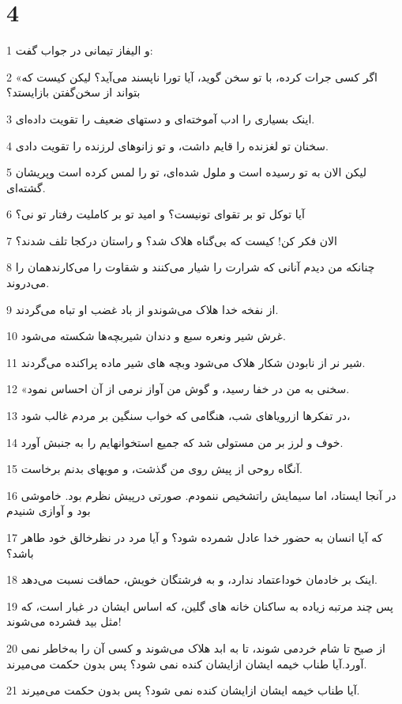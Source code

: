 \chapter{4}

\par 1 و الیفاز تیمانی در جواب گفت:
\par 2 «اگر کسی جرات کرده، با تو سخن گوید، آیا تورا ناپسند می‌آید؟ لیکن کیست که بتواند از سخن‌گفتن بازایستد؟
\par 3 اینک بسیاری را ادب آموخته‌ای و دستهای ضعیف را تقویت داده‌ای.
\par 4 سخنان تو لغزنده را قایم داشت، و تو زانوهای لرزنده را تقویت دادی.
\par 5 لیکن الان به تو رسیده است و ملول شده‌ای، تو را لمس کرده است وپریشان گشته‌ای.
\par 6 آیا توکل تو بر تقوای تونیست؟ و امید تو بر کاملیت رفتار تو نی؟
\par 7 الان فکر کن! کیست که بی‌گناه هلاک شد؟ و راستان درکجا تلف شدند؟
\par 8 چنانکه من دیدم آنانی که شرارت را شیار می‌کنند و شقاوت را می‌کارندهمان را می‌دروند.
\par 9 از نفخه خدا هلاک می‌شوندو از باد غضب او تباه می‌گردند.
\par 10 غرش شیر ونعره سبع و دندان شیربچه‌ها شکسته می‌شود.
\par 11 شیر نر از نابودن شکار هلاک می‌شود وبچه های شیر ماده پراکنده می‌گردند.
\par 12 «سخنی به من در خفا رسید، و گوش من آواز نرمی از آن احساس نمود.
\par 13 در تفکرها ازرویاهای شب، هنگامی که خواب سنگین بر مردم غالب شود،
\par 14 خوف و لرز بر من مستولی شد که جمیع استخوانهایم را به جنبش آورد.
\par 15 آنگاه روحی از پیش روی من گذشت، و مویهای بدنم برخاست.
\par 16 در آنجا ایستاد، اما سیمایش راتشخیص ننمودم. صورتی در‌پیش نظرم بود. خاموشی بود و آوازی شنیدم
\par 17 که آیا انسان به حضور خدا عادل شمرده شود؟ و آیا مرد در نظرخالق خود طاهر باشد؟
\par 18 اینک بر خادمان خوداعتماد ندارد، و به فرشتگان خویش، حماقت نسبت می‌دهد.
\par 19 پس چند مرتبه زیاده به ساکنان خانه های گلین، که اساس ایشان در غبار است، که مثل بید فشرده می‌شوند!
\par 20 از صبح تا شام خردمی شوند، تا به ابد هلاک می‌شوند و کسی آن را به‌خاطر نمی آورد.آیا طناب خیمه ایشان ازایشان کنده نمی شود؟ پس بدون حکمت می‌میرند.
\par 21 آیا طناب خیمه ایشان ازایشان کنده نمی شود؟ پس بدون حکمت می‌میرند.
 
